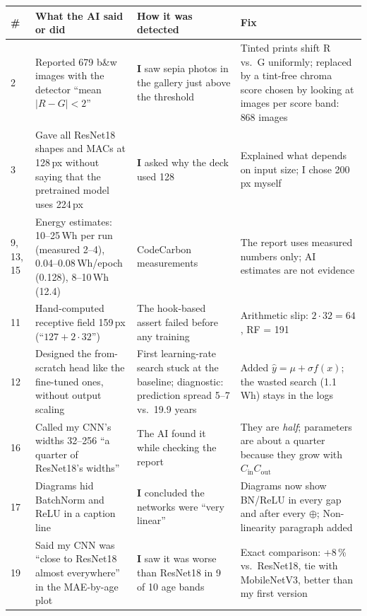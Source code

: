 \documentclass[10pt,a4paper]{article}
\begin{document}
\begin{longtable}{@{}p{0.5cm}p{4.9cm}p{4.9cm}p{5.6cm}@{}}
\toprule
\# & What the AI said or did & How it was detected & Fix \\
\midrule\endhead
2 & Reported 679 b\&w images with the detector ``mean $|R-G|<2$'' & \textbf{I} saw sepia photos in the gallery just above the threshold & Tinted prints shift R vs.\ G uniformly; replaced by a tint-free chroma score chosen by looking at images per score band: 868 images \\
3 & Gave all ResNet18 shapes and MACs at 128\,px without saying that the pretrained model uses 224\,px & \textbf{I} asked why the deck used 128 & Explained what depends on input size; I chose 200\,px myself \\
9, 13, 15 & Energy estimates: 10--25\,Wh per run (measured 2--4), 0.04--0.08\,Wh/epoch (0.128), 8--10\,Wh (12.4) & CodeCarbon measurements & The report uses measured numbers only; AI estimates are not evidence \\
11 & Hand-computed receptive field 159\,px (``$127 + 2\cdot32$'') & The hook-based assert failed before any training & Arithmetic slip: $2\cdot32=64$, RF = 191 \\
12 & Designed the from-scratch head like the fine-tuned ones, without output scaling & First learning-rate search stuck at the baseline; diagnostic: prediction spread 5--7 vs.\ 19.9 years & Added $\hat y=\mu+\sigma f(x)$; the wasted search (1.1\,Wh) stays in the logs \\
16 & Called my CNN's widths 32--256 ``a quarter of ResNet18's widths'' & The AI found it while checking the report & They are \emph{half}; parameters are about a quarter because they grow with $C_{\text{in}}C_{\text{out}}$ \\
17 & Diagrams hid BatchNorm and ReLU in a caption line & \textbf{I} concluded the networks were ``very linear'' & Diagrams now show BN/ReLU in every gap and after every $\oplus$; Non-linearity paragraph added \\
19 & Said my CNN was ``close to ResNet18 almost everywhere'' in the MAE-by-age plot & \textbf{I} saw it was worse than ResNet18 in 9 of 10 age bands & Exact comparison: +8\,\% vs.\ ResNet18, tie with MobileNetV3, better than my first version \\
\bottomrule
\end{longtable}
\end{document}

